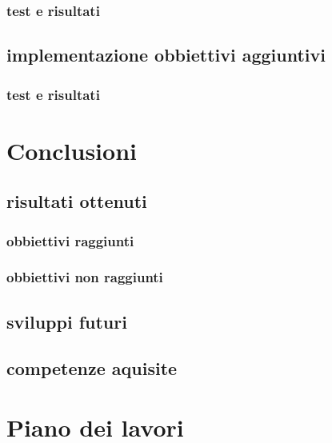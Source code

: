 \documentclass[twoside]{supsistudent}
\begin{document}
\subsection{test e risultati}%


\section{implementazione obbiettivi aggiuntivi}%
\subsection{test e risultati}%

\chapter{Conclusioni}
\section{risultati ottenuti}
\subsection{obbiettivi raggiunti}
\subsection{obbiettivi non raggiunti}
\section{sviluppi futuri}%
\section{competenze aquisite}%

\chapter{Piano dei lavori}%








\end{document}

